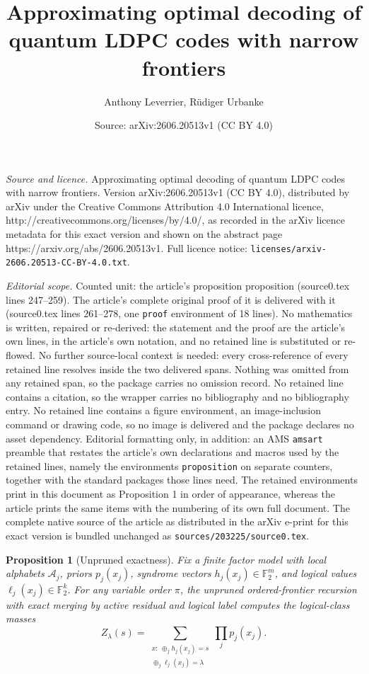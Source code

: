 \documentclass[10pt,a4paper]{amsart}
\title{Approximating optimal decoding of quantum LDPC codes with narrow frontiers}
\author{Anthony Leverrier, R\"udiger Urbanke}
\date{Source: arXiv:2606.20513v1 (CC BY 4.0)}
\newtheorem{proposition}{Proposition}
\newcommand{\A}{\mathcal{A}}
\newcommand{\GF}{\mathbb{F}_2}
\begin{document}
\maketitle

\noindent\emph{Source and licence.} Approximating optimal decoding of quantum LDPC codes with narrow frontiers. Version arXiv:2606.20513v1 (CC BY 4.0), distributed by arXiv under the Creative Commons Attribution 4.0 International licence, http://creativecommons.org/licenses/by/4.0/, as recorded in the arXiv licence metadata for this exact version and shown on the abstract page https://arxiv.org/abs/2606.20513v1. Full licence notice: \texttt{licenses/arxiv-2606.20513-CC-BY-4.0.txt}.\par\smallskip

\noindent\textit{Editorial scope.} Counted unit: the article's proposition proposition (source0.tex lines 247--259). The article's complete original proof of it is delivered with it (source0.tex lines 261--278, one \texttt{proof} environment of 18 lines). No mathematics is written, repaired or re-derived: the statement and the proof are the article's own lines, in the article's own notation, and no retained line is substituted or re-flowed.  No further source-local context is needed: every cross-reference of every retained line resolves inside the two delivered spans.  Nothing was omitted from any retained span, so the package carries no omission record.  No retained line contains a citation, so the wrapper carries no bibliography and no bibliography entry.  No retained line contains a figure environment, an image-inclusion command or drawing code, so no image is delivered and the package declares no asset dependency.  Editorial formatting only, in addition: an AMS \texttt{amsart} preamble that restates the article's own declarations and macros used by the retained lines, namely the environments \texttt{proposition} on separate counters, together with the standard packages those lines need.  The retained environments print in this document as Proposition 1 in order of appearance, whereas the article prints the same items with the numbering of its own full document.  The complete native source of the article as distributed in the arXiv e-print for this exact version is bundled unchanged as \texttt{sources/203225/source0.tex}.
\begin{proposition}[Unpruned exactness]
Fix a finite factor model with local alphabets \(\A_j\), priors \(p_j(x_j)\),
syndrome vectors \(h_j(x_j)\in\GF^m\), and logical values
\(\ell_j(x_j)\in\GF^k\). For any variable order \(\pi\), the unpruned
ordered-frontier recursion with exact merging by active residual and logical
label computes the logical-class masses
\begin{equation}
  Z_\lambda(s)
  =
  \sum_{\substack{x:\ \oplus_j h_j(x_j)=s\\ \oplus_j \ell_j(x_j)=\lambda}}
    \prod_j p_j(x_j).
\end{equation}
\end{proposition}
\end{document}
